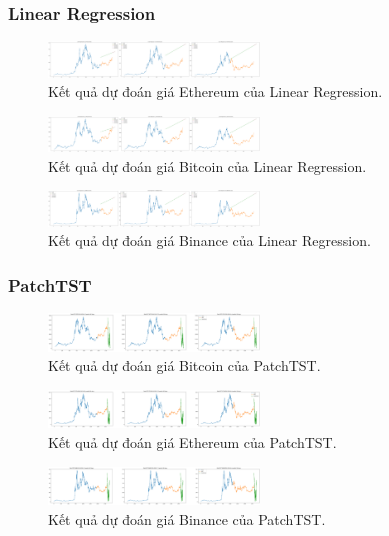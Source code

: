 \documentclass[conference]{IEEEtran}
\begin{document}
\subsubsection{Linear Regression}
\begin{figure}[H]
    \centering
    \includegraphics[width=0.5\textwidth]{bibliography/pictures/LinearRegression_ETH.png}
    \caption{Kết quả dự đoán giá Ethereum của Linear Regression.}
\end{figure}
\begin{figure}[H]
    \centering
    \includegraphics[width=0.5\textwidth]{bibliography/pictures/LinearRegression_BTC.png}
    \caption{Kết quả dự đoán giá Bitcoin của Linear Regression.}
\end{figure}
\begin{figure}[H]
    \centering
    \includegraphics[width=0.5\textwidth]{bibliography/pictures/LinearRegression_BNB.png}
    \caption{Kết quả dự đoán giá Binance của Linear Regression.}
\end{figure}
\subsubsection{PatchTST}

\begin{figure}[H]
    \centering
    \includegraphics[width=0.5\textwidth]{bibliography/Figure/PatchTST_BTC_90.png}
    \caption{Kết quả dự đoán giá Bitcoin của PatchTST.}
\end{figure}
\begin{figure}[H]
    \centering
    \includegraphics[width=0.5\textwidth]{bibliography/Figure/PatchTST_ETH_90.png}
    \caption{Kết quả dự đoán giá Ethereum của PatchTST.}
\end{figure}
\begin{figure}[H]
    \centering
    \includegraphics[width=0.5\textwidth]{bibliography/Figure/PatchTST_BNB_90.png}
    \caption{Kết quả dự đoán giá Binance của PatchTST.}
\end{figure}
\end{document}
